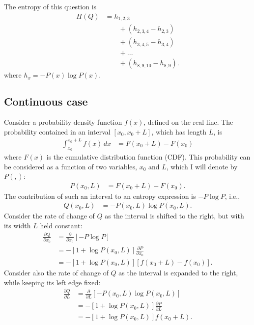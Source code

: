 \documentclass[entropy,article,accept,oneauthor,pdftex,10pt,a4paper]{mdpi}
\begin{document}
The entropy of this question is
\begin{align}
H(Q) &= h_{1,2,3}\\
     & \quad \quad + \left(h_{2,3,4} - h_{2,3}\right) \\
     & \quad \quad + \left(h_{3,4,5} - h_{3,4}\right) \\
     & \quad \quad + ... \\
     & \quad \quad + \left(h_{8,9,10} - h_{8,9}\right).
\end{align}
where $h_{x} = -P(x)\log P(x)$.


\subsection*{Continuous case}

Consider a probability density function $f(x)$, defined on the real
line. The probability contained in an interval
$[x_0, x_0 + L]$, which has length $L$, is
\begin{align}
\int_{x_0}^{x_0 + L} f(x) \, dx &= F(x_0 + L) - F(x_0)
\end{align}
where $F(x)$ is the cumulative distribution function (CDF).
This probability can be considered as a function of two variables,
$x_0$ and $L$, which I will denote by $P(,)$:
\begin{align}
P(x_0, L) &= F(x_0 + L) - F(x_0).
\end{align}
The contribution of such an interval to an entropy expression
is $-P\log P$, i.e.,
\begin{align}
Q(x_0, L) &= -P(x_0, L) \log P(x_0, L).
\end{align}
Consider the rate of change of $Q$ as the interval is shifted to
the right, but with its width $L$ held constant:
\begin{align}
\frac{\partial Q}{\partial x_0} &= \frac{\partial}{\partial x_0}
    \left[-P\log P\right] \\
    &= -\left[1 + \log P(x_0, L)\right]\frac{\partial P}{\partial x_0} \\
    &= -\left[1 + \log P(x_0, L)\right]\left[f(x_0 + L) - f(x_0)\right].
\end{align}
Consider also the rate of change of $Q$ as the interval is
expanded to the right, while keeping its left edge fixed:
\begin{align}
\frac{\partial Q}{\partial L} &= \frac{\partial}{\partial L}
    \left[-P(x_0, L) \log P(x_0, L)\right] \\
    &= -\left[1 + \log P(x_0, L)\right]\frac{\partial P}{\partial L} \\
    &= -\left[1 + \log P(x_0, L)\right]f(x_0 + L).
\end{align}
\end{document}
